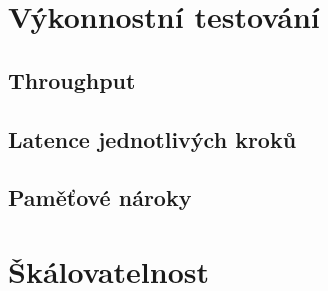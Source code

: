 
\section{Výkonnostní testování}
\label{sec:vykonnostni_testovani}


\subsection{Throughput}


\subsection{Latence jednotlivých kroků}


\subsection{Paměťové nároky}


\section{Škálovatelnost}
\label{sec:skalovatelnost}



